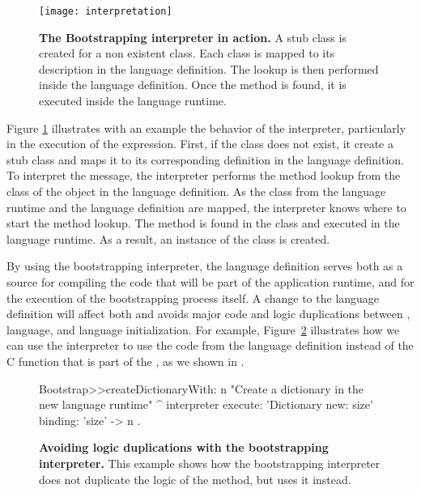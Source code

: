 \begin{figure}[!ht]
\center
\texttt{[image: interpretation]}
\caption{\textbf{The Bootstrapping interpreter in action.} A stub class is created for a non existent class. Each class is mapped to its description in the language definition. The lookup is then performed inside the language definition. Once the method is found, it is executed inside the language runtime.\label{fig:interpretation}}
\end{figure}

Figure \ref{fig:interpretation} illustrates with an example the behavior of the interpreter, particularly in the execution of the  expression. First, if the class  does not exist, it create a stub  class and maps it to its corresponding definition in the language definition. To interpret the  message, the interpreter performs the method lookup from the class of the object in the language definition. As the class from the language runtime and the language definition are mapped, the interpreter knows where to start the method lookup. The method is found in the  class and executed in the language runtime. As a result, an instance of the  class is created.

By using the bootstrapping interpreter, the language definition serves both as a source for compiling the code that will be part of the application runtime, and for the execution of the bootstrapping process itself. A change to the language definition will affect both and avoids major code and logic duplications between \VM, language, and language initialization. For example, Figure~\ref{code:logic_dup3} illustrates how we can use the interpreter to use the  code from the language definition instead of the C function that is part of the \VM, as we shown in .


\begin{figure}[ht]
\begin{code}
Bootstrap>>createDictionaryWith: n
    "Create a dictionary in the new language runtime"
    ^ interpreter
            execute: 'Dictionary new: size'
            binding: { 'size' -> n }.
\end{code}
\caption{\textbf{Avoiding logic duplications with the bootstrapping interpreter.} This example shows how the bootstrapping interpreter does not duplicate the logic of the  method, but uses it instead.\label{code:logic_dup3}}
\end{figure}


